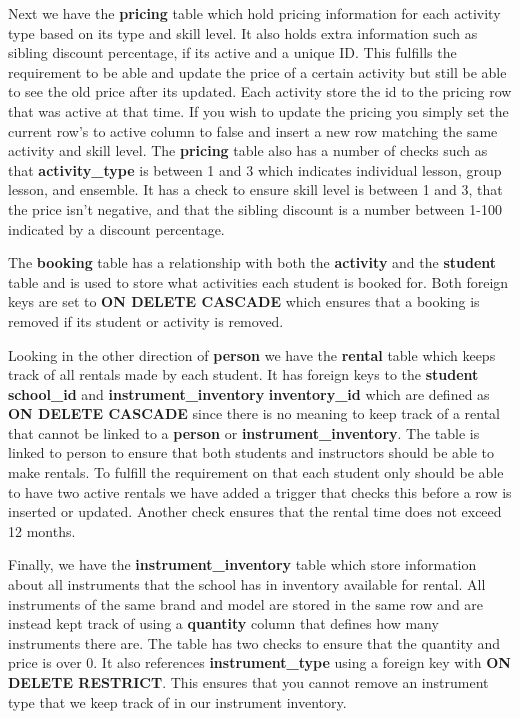 \documentclass[a4paper]{scrartcl}
\begin{document}
Next we have the \textbf{pricing} table which hold pricing information for each activity type based on its type and skill level. It also holds extra information such as sibling discount percentage, if its active and a unique ID. This fulfills the requirement to be able and update the price of a certain activity but still be able to see the old price after its updated. Each activity store the id to the pricing row that was active at that time. If you wish to update the pricing you simply set the current row's to active column to false and insert a new row matching the same activity and skill level. The \textbf{pricing} table also has a number of checks such as that \textbf{activity\_type} is between 1 and 3 which indicates individual lesson, group lesson, and ensemble. It has a check to ensure skill level is between 1 and 3, that the price isn't negative, and that the sibling discount is a number between 1-100 indicated by a discount percentage.

The \textbf{booking} table has a relationship with both the \textbf{activity} and the \textbf{student} table and is used to store what activities each student is booked for. Both foreign keys are set to \textbf{ON DELETE CASCADE} which ensures that a booking is removed if its student or activity is removed.

Looking in the other direction of \textbf{person} we have the \textbf{rental} table which keeps track of all rentals made by each student. It has foreign keys to the \textbf{student} \textbf{school\_id} and \textbf{instrument\_inventory} \textbf{inventory\_id} which are defined as \textbf{ON DELETE CASCADE} since there is no meaning to keep track of a rental that cannot be linked to a \textbf{person} or \textbf{instrument\_inventory}. The table is linked to person to ensure that both students and instructors should be able to make rentals. To fulfill the requirement on that each student only should be able to have two active rentals we have added a trigger that checks this before a row is inserted or updated. Another check ensures that the rental time does not exceed 12 months.

Finally, we have the \textbf{instrument\_inventory} table which store information about all instruments that the school has in inventory available for rental. All instruments of the same brand and model are stored in the same row and are instead kept track of using a \textbf{quantity} column that defines how many instruments there are. The table has two checks to ensure that the quantity and price is over 0. It also references \textbf{instrument\_type} using a foreign key with \textbf{ON DELETE RESTRICT}. This ensures that you cannot remove an instrument type that we keep track of in our instrument inventory.
\end{document}
